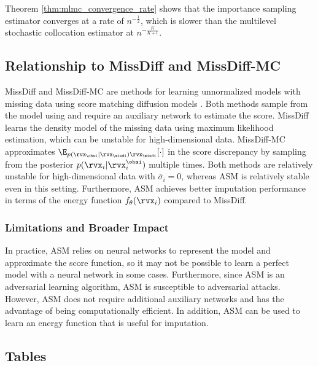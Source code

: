 \documentclass{article} %
\begin{document}
Theorem \ref{thm:mlmc_convergence_rate} shows that the importance sampling estimator converges at a rate of $n^{-\frac{1}{2}}$, which is slower than the multilevel stochastic collocation estimator at $n^{-\frac{K}{K+1}}$.
\subsection{Relationship to MissDiff and MissDiff-MC}
MissDiff and MissDiff-MC are methods for learning unnormalized models with missing data using score matching diffusion models \citep{Ouyang2023}. Both methods sample from the model using  \citep{Song2019} and require an auxiliary network to estimate the score. MissDiff learns the density model of the missing data using maximum likelihood estimation, which can be unstable for high-dimensional data. MissDiff-MC approximates $\E_{p(\rvx_{\obsi} | \rvx_{\misdi}) \rvx_{\misdi}}[\cdot]$ in the score discrepancy by sampling from the posterior $p(\rvx_{i} | \rvx_{i}^{\obsi})$ multiple times. Both methods are relatively unstable for high-dimensional data with $\bar{\sigma}_{i} = 0$, whereas ASM is relatively stable even in this setting. Furthermore, ASM achieves better imputation performance in terms of the energy function $f_{\theta}(\rvx_{i})$ compared to MissDiff.

\subsubsection{Limitations and Broader Impact}
\label{subsec:limitations}
In practice, ASM relies on neural networks to represent the model and approximate the score function, so it may not be possible to learn a perfect model with a neural network in some cases. Furthermore, since ASM is an adversarial learning algorithm, ASM is susceptible to adversarial attacks. However, ASM does not require additional auxiliary networks and has the advantage of being computationally efficient. In addition, ASM can be used to learn an energy function that is useful for imputation.


\subsection{Tables}

\begin{table}[h!]
\centering
	\caption{Mean energy ($\pm$ SD) on the test samples.}
\label{table:energy_modes}
\end{table}
\end{document}
